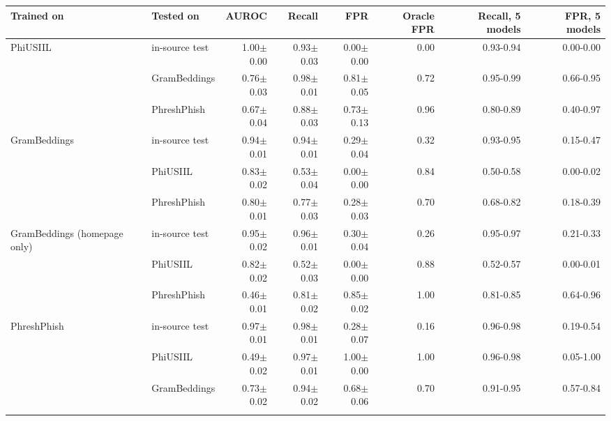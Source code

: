 {\scriptsize\setlength{\tabcolsep}{3.5pt}
\begin{tabular}{llrrrrrr}
\toprule
\textbf{Trained on} & \textbf{Tested on} & \textbf{AUROC} & \textbf{Recall} & \textbf{FPR} & \textbf{Oracle FPR} & \textbf{Recall, 5 models} & \textbf{FPR, 5 models} \\
\midrule
PhiUSIIL & in-source test & 1.00$\pm$0.00 & 0.93$\pm$0.03 & 0.00$\pm$0.00 & 0.00 & 0.93-0.94 & 0.00-0.00 \\
 & GramBeddings & 0.76$\pm$0.03 & 0.98$\pm$0.01 & 0.81$\pm$0.05 & 0.72 & 0.95-0.99 & 0.66-0.95 \\
 & PhreshPhish & 0.67$\pm$0.04 & 0.88$\pm$0.03 & 0.73$\pm$0.13 & 0.96 & 0.80-0.89 & 0.40-0.97 \\
\addlinespace
GramBeddings & in-source test & 0.94$\pm$0.01 & 0.94$\pm$0.01 & 0.29$\pm$0.04 & 0.32 & 0.93-0.95 & 0.15-0.47 \\
 & PhiUSIIL & 0.83$\pm$0.02 & 0.53$\pm$0.04 & 0.00$\pm$0.00 & 0.84 & 0.50-0.58 & 0.00-0.02 \\
 & PhreshPhish & 0.80$\pm$0.01 & 0.77$\pm$0.03 & 0.28$\pm$0.03 & 0.70 & 0.68-0.82 & 0.18-0.39 \\
\addlinespace
GramBeddings (homepage only) & in-source test & 0.95$\pm$0.02 & 0.96$\pm$0.01 & 0.30$\pm$0.04 & 0.26 & 0.95-0.97 & 0.21-0.33 \\
 & PhiUSIIL & 0.82$\pm$0.02 & 0.52$\pm$0.03 & 0.00$\pm$0.00 & 0.88 & 0.52-0.57 & 0.00-0.01 \\
 & PhreshPhish & 0.46$\pm$0.01 & 0.81$\pm$0.02 & 0.85$\pm$0.02 & 1.00 & 0.81-0.85 & 0.64-0.96 \\
\addlinespace
PhreshPhish & in-source test & 0.97$\pm$0.01 & 0.98$\pm$0.01 & 0.28$\pm$0.07 & 0.16 & 0.96-0.98 & 0.19-0.54 \\
 & PhiUSIIL & 0.49$\pm$0.02 & 0.97$\pm$0.01 & 1.00$\pm$0.00 & 1.00 & 0.96-0.98 & 0.05-1.00 \\
 & GramBeddings & 0.73$\pm$0.02 & 0.94$\pm$0.02 & 0.68$\pm$0.06 & 0.70 & 0.91-0.95 & 0.57-0.84 \\
\addlinespace
\bottomrule
\end{tabular}
}
